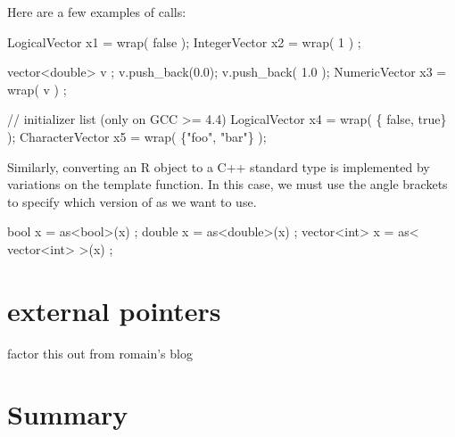 Here are a few examples of  calls: 

\begin{example}
LogicalVector x1 = wrap( false ); 
IntegerVector x2 = wrap( 1 ) ;    

vector<double> v ; 
v.push_back(0.0); v.push_back( 1.0 ); 
NumericVector x3 = wrap( v ) ;  

// initializer list (only on GCC >= 4.4)
LogicalVector x4 = wrap( \{ false, true\} );
CharacterVector x5 = wrap( \{"foo", "bar"\} );
\end{example}

Similarly, converting an R object to a C++ standard type is implemented
by variations on the  template function. In this case, we must 
use the angle brackets to specify which version of as we want to use. 

\begin{example}
bool x = as<bool>(x) ;
double x = as<double>(x) ;
vector<int> x = as< vector<int> >(x) ;
\end{example}

\section{external pointers}

factor this out from romain's blog


\section{Summary}







\address{Romain Fran\c{c}ois\\
  Professionnal R Enthusiast\\
  3 rue Emile Bonnet, 34 090 Montpellier\\
  FRANCE}\\

\address{Dirk Eddelbuettel\\
  Debian Project\\
  Chicago, IL\\
  USA}\\

